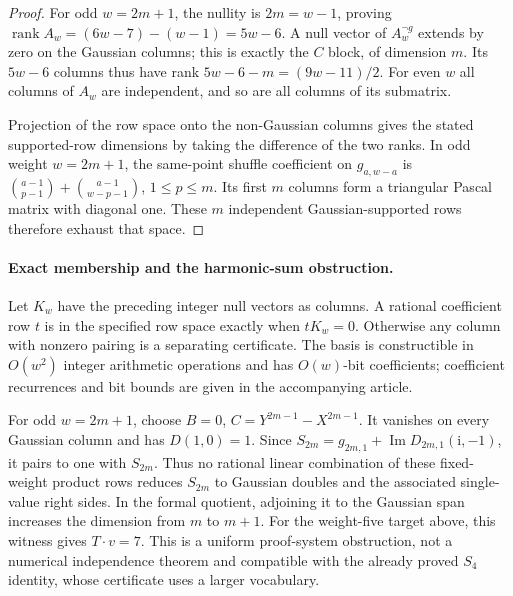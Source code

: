 \begin{proof}
For odd $w=2m+1$, the nullity is $2m=w-1$, proving
$\operatorname{rank}A_w=(6w-7)-(w-1)=5w-6$. A null vector of
$A_w^{\neg g}$ extends by zero on the Gaussian columns; this is exactly
the $C$ block, of dimension $m$. Its $5w-6$ columns thus have rank
$5w-6-m=(9w-11)/2$. For even $w$ all columns of $A_w$ are independent,
and so are all columns of its submatrix.

Projection of the row space onto the non-Gaussian columns gives the stated
supported-row dimensions by taking the difference of the two ranks. In odd
weight $w=2m+1$, the same-point shuffle coefficient on $g_{a,w-a}$ is
$\binom{a-1}{p-1}+\binom{a-1}{w-p-1}$, $1\le p\le m$.
Its first $m$ columns form a triangular Pascal matrix with diagonal one.
These $m$ independent Gaussian-supported rows therefore exhaust that space.
\end{proof}

\paragraph{Exact membership and the harmonic-sum obstruction.}
Let $K_w$ have the preceding integer null vectors as columns. A rational
coefficient row $t$ is in the specified row space exactly when $tK_w=0$.
Otherwise any column with nonzero pairing is a separating certificate.
The basis is constructible in $O(w^2)$ integer arithmetic operations and
has $O(w)$-bit coefficients; coefficient recurrences and bit bounds are
given in the accompanying article.

For odd $w=2m+1$, choose $B=0$, $C=Y^{2m-1}-X^{2m-1}$.
It vanishes on every Gaussian column and has $D(1,0)=1$.
Since $S_{2m}=g_{2m,1}+\operatorname{Im}D_{2m,1}(\mathrm i,-1)$,
it pairs to one with $S_{2m}$. Thus no rational linear combination of these
fixed-weight product rows reduces $S_{2m}$ to Gaussian doubles and the
associated single-value right sides. In the formal quotient, adjoining it
to the Gaussian span increases the dimension from $m$ to $m+1$.
For the weight-five target above, this witness gives $T\cdot v=7$.
This is a uniform proof-system obstruction, not a numerical independence
theorem and compatible with the already proved $S_4$ identity, whose certificate uses a larger vocabulary.

